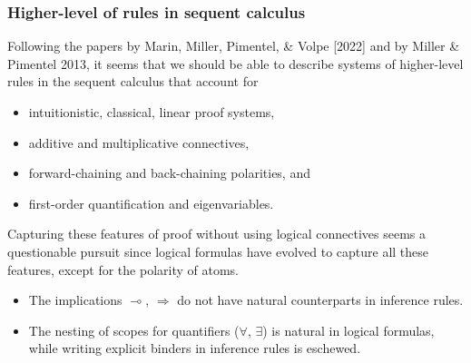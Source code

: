 \documentclass[9pt]{beamer}
\begin{document}
\begin{frame}
\frametitle{Higher-level of rules in sequent calculus}

Following the papers by Marin, Miller, Pimentel, \& Volpe [2022] and
by Miller \& Pimentel 2013, it seems that we should be able to
describe systems of higher-level rules in the sequent calculus that
account for
\begin{itemize}
\item intuitionistic, classical, linear proof systems,
\item additive and multiplicative connectives,
\item forward-chaining and back-chaining polarities, and 
\item first-order quantification and eigenvariables.
\end{itemize}
\vfill

Capturing these features of proof without using logical connectives
seems a questionable pursuit since logical formulas have evolved to
capture all these features, except for the polarity of atoms.
\vfill

\begin{itemize}
\item The implications $\multimap$, $\Rightarrow$ do not 
  have natural counterparts in inference rules.
  
\item The nesting of scopes for quantifiers ($\forall$, $\exists$) is
  natural in logical formulas, while writing explicit binders in
  inference rules is eschewed.
\end{itemize}
\vfill

\end{frame}
\end{document}
